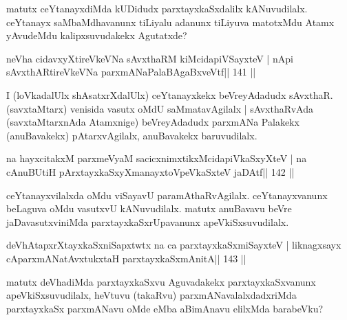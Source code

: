 \begin{artha}
matutx ceYtanayxdiMda kUDidudx parxtayxkaSxdalilx kANuvudilalx. ceYtanayx saMbaMdhavanunx tiLiyalu adanunx tiLiyuva matotxMdu Atamx yAvudeMdu kalipxsuvudakekx Agutatxde? 
\end{artha}

\begin{shl}
neVha cidavxyXtireVkeVNa sAvxthaRM kiMcidapiVSayxteV |
nApi sAvxthARtireVkeVNa parxmANaPalaBAgaBxveVtf\hfill || 141 ||
\end{shl}

\begin{artha}
I (loVkadalUlx shAsatxrXdalUlx) ceYtanayxkekx beVreyAdadudx sAvxthaR.  (savxtaMtarx) venisida vasutx oMdU saMmatavAgilalx | sAvxthaRvAda  (savxtaMtarxnAda Atamxnige) beVreyAdadudx parxmANa Palakekx  (anuBavakekx) pAtarxvAgilalx, anuBavakekx baruvudilalx.
\end{artha}

\begin{shl}
na hayxcitakxM parxmeVyaM sacicxnimxtikxMcidapiVkaSxyXteV |
na cAnuBUtiH pArxtayxkaSxyXmanayxtoV\s peVkaSxteV jaDAtf\hfill || 142 ||
\end{shl}

\begin{artha}
ceYtanayxvilalxda oMdu viSayavU paramAthaRvAgilalx. ceYtanayxvanunx  beLaguva oMdu vasutxvU kANuvudilalx. matutx anuBavavu beVre jaDavasutxviniMda parxtayxkaSxrUpavanunx apeVkiSxsuvudilalx.
\end{artha}


\begin{shl}
\footnotemark[3]deVhAtapxrXtayxkaSxniSapxtwtx na ca parxtayxkaSxmiSayxteV |
liknagxsayx cAparxmANatAvxtukxtaH  parxtayxkaSxmAnitA\hfill || 143 ||
\end{shl}

\begin{artha}
matutx deVhadiMda parxtayxkaSxvu Aguvadakekx parxtayxkaSxvanunx apeVkiSxsuvudilalx, heVtuvu (takaRvu) parxmANavalalxdadxriMda parxtayxkaSx parxmANavu oMde eMba aBimAnavu elilxMda barabeVku?
\end{artha}

